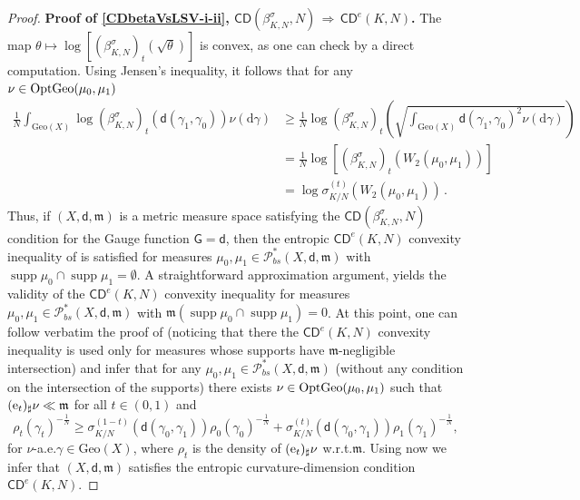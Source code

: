 \documentclass[11pt,a4paper]{article}
\theoremstyle{plain}
\theoremstyle{definition}
\theoremstyle{remark}
\numberwithin{equation}{section}
\DeclareMathOperator{\supp}{\mathrm{supp}}
\newcommand{\CD}{\mathsf{CD}}
\newcommand{\Geo}{\mathrm{Geo}}
\newcommand{\OptGeo}{{\rm OptGeo}}
\newcommand{\Prob}{\mathcal{P}}
\newcommand{\di}{\mathrm{d}}
\newcommand{\mm}{\mathfrak m}
\newcommand{\ee}{{\rm e}}
\newcommand{\sfd}{\mathsf d}
\newcommand{\sfG}{\mathsf G}
\begin{document}
\begin{proof}
\textbf{Proof of \ref{CDbetaVsLSV-i-ii},  $\CD(\beta_{K,N}^{\sigma}, N) \, \Rightarrow\, \CD^{e}(K,N)$.}
The map $\theta\mapsto \log\left[ (\beta_{K,N}^{\sigma})_t(\sqrt{\theta})\right]$ is convex, as one can check by a direct computation.  Using Jensen's inequality, it follows that for any $\nu\in\OptGeo(\mu_0,\mu_1)$
\begin{align}
\frac{1}{N}\int_{\Geo(X)} \log (\beta_{K,N}^{\sigma})_t(\sfd(\gamma_{1}, \gamma_{0})) \nu(\di\gamma) & \geq \frac{1}{N} \log (\beta_{K,N}^{\sigma})_t   \left(\sqrt{ \int_{\Geo(X)} \sfd(\gamma_{1}, \gamma_{0})^{2} \nu(\di\gamma)}\right)\\
& = \frac{1}{N}   \log \left[ (\beta_{K,N}^{\sigma})_t (W_2(\mu_0,\mu_1))\right]\\
& =  \log  \sigma_{K/N}^{(t)}(W_2(\mu_0,\mu_1))  \, . \label{eq:logbetasigma}
\end{align}
Thus, if $(X,\sfd,\mm)$ is a metric measure space satisfying the $\CD(\beta_{K,N}^{\sigma}, N)$ condition for the Gauge function $\sfG=\sfd$, then the entropic  $\CD^{e}(K,N)$ convexity inequality of \cite{EKS} is satisfied for measures $\mu_0,\mu_1\in \Prob_{bs}^{*}(X,\sfd,\mm)$ with $\supp \mu_{0}\cap \supp \mu_{1}=\emptyset$. A straightforward approximation argument, yields the validity of the  $\CD^{e}(K,N)$ convexity inequality for measures $\mu_0,\mu_1\in \Prob_{bs}^{*}(X,\sfd,\mm)$ with $\mm(\supp \mu_{0}\cap \supp \mu_{1})=0$. At this point, one can follow verbatim the proof of  \cite[Thm.\@ 3.12, (iii) $\Rightarrow$ (ii)]{EKS} (noticing that there the  $\CD^{e}(K,N)$ convexity inequality is used only for measures whose supports have $\mm$-negligible intersection)  and infer that for any $\mu_0,\mu_{1} \in \Prob_{bs}^{*}(X,\sfd,\mm)$ (without any condition on the intersection of the supports) there exists  $\nu\in \OptGeo(\mu_{0}, \mu_{1})$ such that $(\ee_{t})_{\sharp} \nu\ll \mm$ for all $t\in (0,1)$ and 
\begin{equation}\label{eq:CDeKNgeo}
\rho_{t}(\gamma_{t})^{-\frac 1 N}\geq \sigma_{K/N}^{(1-t)} (\sfd(\gamma_{0}, \gamma_{1})) \rho_{0}(\gamma_{0})^{-\frac  1 N}+ \sigma_{K/N}^{(t)} (\sfd(\gamma_{0}, \gamma_{1})) \rho_{1}(\gamma_{1})^{-\frac  1 N} ,
\end{equation}
for $\nu$-a.e.\@ $\gamma\in \Geo(X)$, where $\rho_{t}$ is the density of $(\ee_{t})_{\sharp}\nu$ w.r.t.\@ $\mm$. Using now  \cite[Thm.\@ 3.12, (ii) $\Rightarrow$ (iii)]{EKS} we infer that  $(X,\sfd,\mm)$ satisfies the entropic curvature-dimension condition $\CD^{e}(K,N)$.


\end{proof}
\end{document}
